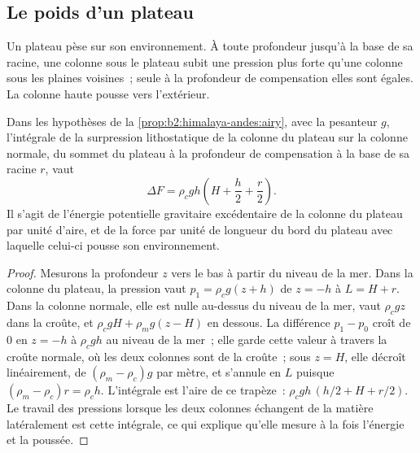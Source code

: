 \subsection{Le poids d'un plateau}

Un plateau pèse sur son environnement. À toute profondeur jusqu'à la base de sa racine, une colonne
sous le plateau subit une pression plus forte qu'une colonne sous les plaines voisines~; seule
à la profondeur de compensation elles sont égales. La colonne haute pousse vers l'extérieur.

\begin{proposition}\label{prop:b2:himalaya-andes:gpe}
Dans les hypothèses de la \cref{prop:b2:himalaya-andes:airy}, avec la pesanteur $g$,
l'intégrale de la surpression lithostatique de la colonne du plateau sur la colonne normale,
du sommet du plateau à la profondeur de compensation à la base de sa racine $r$, vaut
\[
  \Delta F = \rho_c g h \left(H + \frac{h}{2} + \frac{r}{2}\right) .
\]
Il s'agit de l'énergie potentielle gravitaire excédentaire de la colonne
du plateau par unité d'aire, et de la force par unité de longueur
du bord du plateau avec laquelle celui-ci pousse son environnement.
\end{proposition}

\begin{proof}
Mesurons la profondeur $z$ vers le bas à partir du niveau de
la mer. Dans la colonne du plateau, la pression vaut $p_1 =
\rho_c g (z + h)$ de $z = -h$ à $L = H + r$. Dans la colonne normale, elle est nulle au-dessus du niveau de
la mer, vaut $\rho_c g z$ dans la croûte, et $\rho_c g H + \rho_m g (z - H)$ en dessous. La différence $p_1
- p_0$ croît de 0 en $z = -h$ à $\rho_c g h$ au niveau de la mer~; elle garde cette valeur à travers
la croûte normale, où les deux colonnes sont de la croûte~; sous $z = H$, elle décroît linéairement,
de $(\rho_m - \rho_c) g$ par mètre, et s'annule en $L$ puisque $(\rho_m - \rho_c) r = \rho_c
h$. L'intégrale est l'aire de ce trapèze~: $\rho_c g h\,(h/2 + H + r/2)$. Le travail des pressions lorsque les deux colonnes
échangent de la matière latéralement est cette intégrale, ce qui explique qu'elle mesure à la fois l'énergie et la poussée.
\end{proof}

